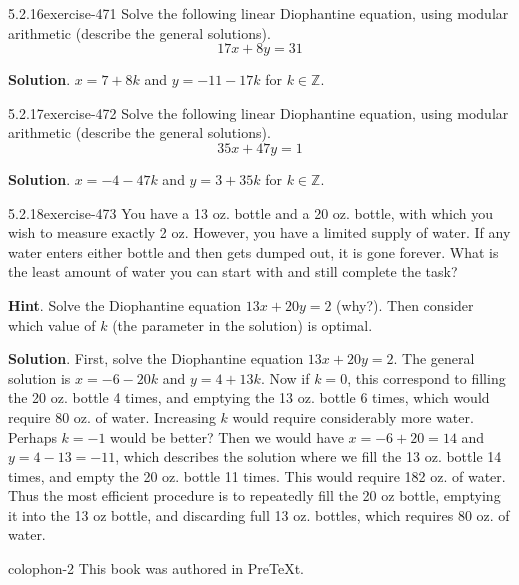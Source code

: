 \documentclass[twoside,11pt,]{book}
\numberwithin{equation}{chapter}
\newcommand{\Z}{\mathbb Z}
\begin{document}
\begin{divisionsolution}{5.2.16}{}{exercise-471}%
\hypertarget{p-5306}{}%
Solve the following linear Diophantine equation, using modular arithmetic (describe the general solutions).%
\begin{equation*}
17x + 8y = 31
\end{equation*}
%
\par\smallskip%
\noindent\textbf{Solution}.\quad%
\hypertarget{p-5307}{}%
\(x = 7+8k\) and \(y = -11 - 17k\) for \(k \in \Z\).%
\end{divisionsolution}%
\begin{divisionsolution}{5.2.17}{}{exercise-472}%
\hypertarget{p-5308}{}%
Solve the following linear Diophantine equation, using modular arithmetic (describe the general solutions).%
\begin{equation*}
35x + 47y = 1
\end{equation*}
%
\par\smallskip%
\noindent\textbf{Solution}.\quad%
\hypertarget{p-5309}{}%
\(x = -4-47k\) and \(y = 3 + 35k\) for \(k \in \Z\).%
\end{divisionsolution}%
\begin{divisionsolution}{5.2.18}{}{exercise-473}%
\hypertarget{p-5310}{}%
You have a 13 oz. bottle and a 20 oz. bottle, with which you wish to measure exactly 2 oz. However, you have a limited supply of water. If any water enters either bottle and then gets dumped out, it is gone forever. What is the least amount of water you can start with and still complete the task?%
\par\smallskip%
\noindent\textbf{Hint}.\quad%
\hypertarget{p-5311}{}%
Solve the Diophantine equation \(13x + 20 y = 2\) (why?).  Then consider which value of \(k\) (the parameter in the solution) is optimal.%
\par\smallskip%
\noindent\textbf{Solution}.\quad%
\hypertarget{p-5312}{}%
First, solve the Diophantine equation \(13x + 20 y = 2\). The general solution is \(x = -6 - 20k\) and \(y = 4+13k\). Now if \(k = 0\), this correspond to filling the 20 oz. bottle 4 times, and emptying the 13 oz. bottle 6 times, which would require 80 oz. of water. Increasing \(k\) would require considerably more water. Perhaps \(k = -1\) would be better? Then we would have \(x = -6+20 = 14\) and \(y = 4-13 = -11\), which describes the solution where we fill the 13 oz. bottle 14 times, and empty the 20 oz. bottle 11 times. This would require 182 oz. of water. Thus the most efficient procedure is to repeatedly fill the 20 oz bottle, emptying it into the 13 oz bottle, and discarding full 13 oz. bottles, which requires 80 oz. of water.%
\end{divisionsolution}%
%
\backmatter
%
%
%
\cleardoublepage
\pagestyle{empty}
\begin{backcolophon}{colophon-2}%
\hypertarget{p-5313}{}%
This book was authored in PreTeXt.%
\end{backcolophon}%
\end{document}

